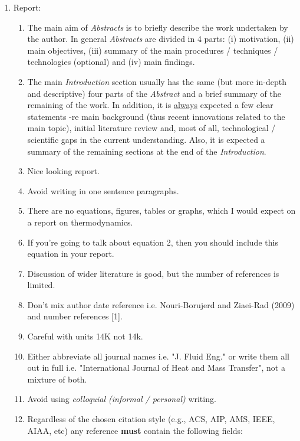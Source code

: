 \documentclass[14pt,twoside]{report}
\begin{document}
\begin{enumerate}

\item Report:
\begin{enumerate}
%
\item The main aim of {\it Abstracts} is to briefly describe the work undertaken by the author. In general {\it Abstracts} are divided in 4 parts: (i) motivation, (ii) main objectives, (iii) summary of the main procedures / techniques / technologies (optional) and (iv) main findings. 
%
\item The main {\it Introduction} section usually has the same (but more in-depth and descriptive) four parts of the {\it Abstract} and a brief summary of the remaining of the work. In addition, it is \underline{always} expected a few clear statements -re main background (thus recent innovations related to the main topic), initial literature review and, most of all, technological / scientific gaps in the current understanding. Also, it is expected a summary of the remaining sections at the end of the {\it Introduction}.
%
\item Nice looking report.
%
\item Avoid writing in one sentence paragraphs.
%
\item There are no equations, figures, tables or graphs, which I would expect on a report on thermodynamics.
%
\item If you're going to talk about equation 2, then you should include this equation in your report.
%
\item Discussion of wider literature is good, but the number of references is limited.
%
\item Don't mix author date reference i.e. Nouri-Borujerd and Ziaei-Rad (2009) and number references [1].
%
\item Careful with units 14K not 14k.
%
\item Either abbreviate all journal names i.e. "J. Fluid Eng." or write them all out in full i.e. "International Journal of Heat and Mass Transfer", not a mixture of both.
%
%
\item Avoid using {\it colloquial (informal / personal)} writing.
%
\item Regardless of the chosen citation style (e.g., ACS, AIP, AMS, IEEE, AIAA, etc) any reference {\bf must} contain the following fields: 

\end{enumerate}
\end{enumerate}
\end{document}
